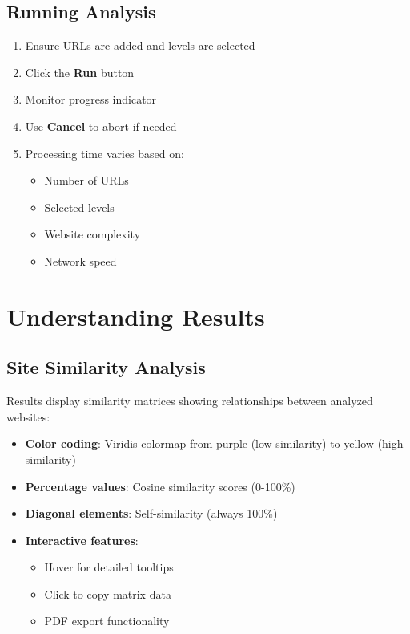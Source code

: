 \subsection{Running Analysis}
\label{subsec:running-analysis}

\begin{enumerate}
    \item Ensure URLs are added and levels are selected
    \item Click the \textbf{Run} button
    \item Monitor progress indicator
    \item Use \textbf{Cancel} to abort if needed
    \item Processing time varies based on:
        \begin{itemize}
            \item Number of URLs
            \item Selected levels
            \item Website complexity
            \item Network speed
        \end{itemize}
\end{enumerate}

\section{Understanding Results}
\label{sec:understanding-results}

\subsection{Site Similarity Analysis}
\label{subsec:similarity-analysis}

Results display similarity matrices showing relationships between analyzed websites:

\begin{itemize}
    \item \textbf{Color coding}: Viridis colormap from purple (low similarity) to yellow (high similarity)
    \item \textbf{Percentage values}: Cosine similarity scores (0-100\%)
    \item \textbf{Diagonal elements}: Self-similarity (always 100\%)
    \item \textbf{Interactive features}:
        \begin{itemize}
            \item Hover for detailed tooltips
            \item Click to copy matrix data
            \item PDF export functionality
        \end{itemize}
\end{itemize}

